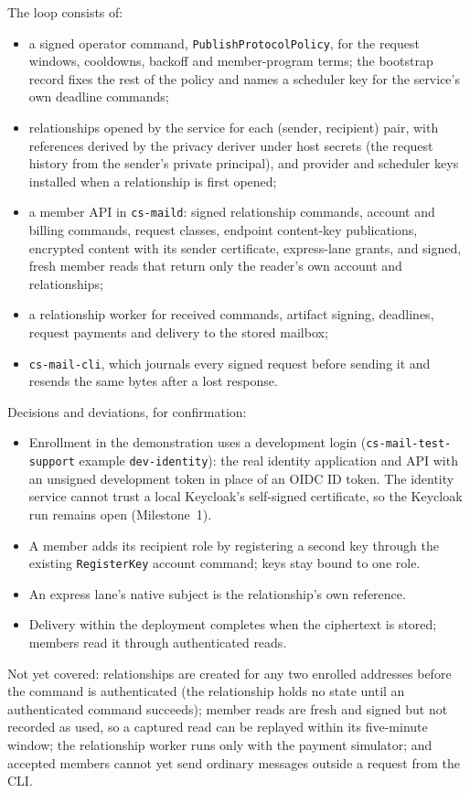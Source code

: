\documentclass[11pt]{article}
\begin{document}
The loop consists of:
\begin{itemize}[nosep]
\item a signed operator command, \texttt{PublishProtocolPolicy}, for the request
  windows, cooldowns, backoff and member-program terms; the bootstrap record fixes
  the rest of the policy and names a scheduler key for the service's own deadline
  commands;
\item relationships opened by the service for each (sender, recipient) pair, with
  references derived by the privacy deriver under host secrets (the request history
  from the sender's private principal), and provider and scheduler keys installed
  when a relationship is first opened;
\item a member API in \texttt{cs-maild}: signed relationship commands, account and
  billing commands, request classes, endpoint content-key publications, encrypted
  content with its sender certificate, express-lane grants, and signed, fresh member
  reads that return only the reader's own account and relationships;
\item a relationship worker for received commands, artifact signing, deadlines,
  request payments and delivery to the stored mailbox;
\item \texttt{cs-mail-cli}, which journals every signed request before sending it and
  resends the same bytes after a lost response.
\end{itemize}

Decisions and deviations, for confirmation:
\begin{itemize}[nosep]
\item Enrollment in the demonstration uses a development login
  (\texttt{cs-mail-test-support} example \texttt{dev-identity}): the real identity
  application and API with an unsigned development token in place of an OIDC ID
  token. The identity service cannot trust a local Keycloak's self-signed
  certificate, so the Keycloak run remains open (Milestone~1).
\item A member adds its recipient role by registering a second key through the
  existing \texttt{RegisterKey} account command; keys stay bound to one role.
\item An express lane's native subject is the relationship's own reference.
\item Delivery within the deployment completes when the ciphertext is stored;
  members read it through authenticated reads.
\end{itemize}

Not yet covered: relationships are created for any two enrolled addresses before
the command is authenticated (the relationship holds no state until an
authenticated command succeeds); member reads are fresh and signed but not
recorded as used, so a captured read can be replayed within its five-minute window;
the relationship worker runs only with the payment simulator; and accepted members
cannot yet send ordinary messages outside a request from the CLI.
\end{document}
